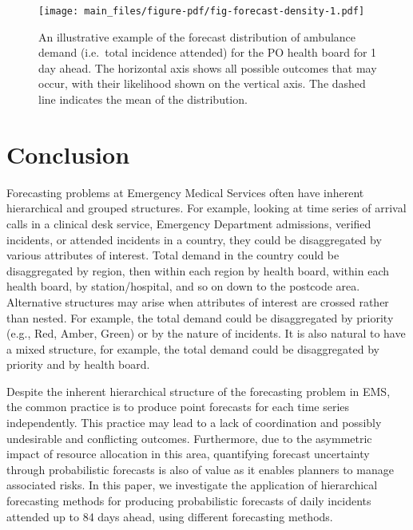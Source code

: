 \documentclass[
  authoryear,
  preprint,
  3p]{elsarticle}
\begin{document}
\begin{figure}[H]

{\centering \texttt{[image: main\_files/figure-pdf/fig-forecast-density-1.pdf]}

}

\caption{\label{fig-forecast-density}An illustrative example of the
forecast distribution of ambulance demand (i.e.~total incidence
attended) for the PO health board for 1 day ahead. The horizontal axis
shows all possible outcomes that may occur, with their likelihood shown
on the vertical axis. The dashed line indicates the mean of the
distribution.}

\end{figure}

\hypertarget{sec-conclusion}{%
\section{Conclusion}\label{sec-conclusion}}

Forecasting problems at Emergency Medical Services often have inherent
hierarchical and grouped structures. For example, looking at time series
of arrival calls in a clinical desk service, Emergency Department
admissions, verified incidents, or attended incidents in a country, they
could be disaggregated by various attributes of interest. Total demand
in the country could be disaggregated by region, then within each region
by health board, within each health board, by station/hospital, and so
on down to the postcode area. Alternative structures may arise when
attributes of interest are crossed rather than nested. For example, the
total demand could be disaggregated by priority (e.g., Red, Amber,
Green) or by the nature of incidents. It is also natural to have a mixed
structure, for example, the total demand could be disaggregated by
priority and by health board.

Despite the inherent hierarchical structure of the forecasting problem
in EMS, the common practice is to produce point forecasts for each time
series independently. This practice may lead to a lack of coordination
and possibly undesirable and conflicting outcomes. Furthermore, due to
the asymmetric impact of resource allocation in this area, quantifying
forecast uncertainty through probabilistic forecasts is also of value as
it enables planners to manage associated risks. In this paper, we
investigate the application of hierarchical forecasting methods for
producing probabilistic forecasts of daily incidents attended up to 84
days ahead, using different forecasting methods.
\end{document}

